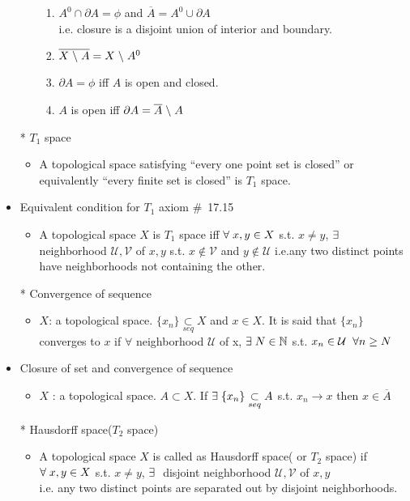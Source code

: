 \documentclass[12pt]{article}
\newcommand{\sptwo}{\hspace{0.2cm}}
\newcommand{\spone}{\hspace{0.1cm}}
\newcommand{\Nat}{\mathbb{N}}
\newcommand{\seq}{\underset{seq}{\subset}}
\newcommand{\cl}{\overline}
\newcommand{\diff}{\spone\backslash\spone}
\newcommand{\exist}{\exists\spone}
\begin{document}
\begin{itemize}
\begin{itemize}
\begin{enumerate}
			\item $A^0\cap \partial{A}=\phi$ and $\cl{A}=A^0\cup \partial{A}$ \\ i.e. \spone closure is a disjoint union of interior and boundary.
			\item $\cl{X\diff A}=X\diff A^0$
			\item $\partial{A}=\phi$ iff $A$ is open and closed.
			\item $A$ is open iff $\partial{A}=\cl{A}\diff A$ 
		\end{enumerate}
	\end{itemize}
	\item[*] $T_1$ space
	\begin{itemize}
		\item A topological space satisfying ``every one point set is closed'' or equivalently ``every finite set is closed'' is $T_1$ space.
	\end{itemize}
	\item Equivalent condition for $T_1$ axiom	\quad \#\ 17.15
	\begin{itemize}
		\item A topological space $X$ is $T_1$ space iff $\forall \spone x,y\in X$ s.t. $x\neq y$, $\exists \spone$ neighborhood $\mathcal{U}, \mathcal{V}$ of $x,y$ s.t. $x\notin \mathcal{V}$ and $y\notin \mathcal{U}$ \sptwo i.e.\sptwo  any two distinct points have neighborhoods not containing the other.
	\end{itemize}
	\item[*] Convergence of sequence
	\begin{itemize}
		\item $X$: a topological space. $\{x_n\}\seq X$ and $x\in X$. It is said that $\{x_n\}$ converges to $x$ if $\forall$ neighborhood $\mathcal{U}$ of x, $\exists \spone N\in \Nat$ s.t. $x_n\in \mathcal{U} \sptwo \forall n\geq N$
	\end{itemize}
	\item Closure of set and convergence of sequence
	\begin{itemize}
		\item $X$ : a topological space. $A\subset X$. If $\exist \{x_n\}\seq A$ s.t. $x_n\rightarrow x$ then $x\in \cl{A}$
	\end{itemize}
	\item[*] Hausdorff space\spone($T_2$ space)
	\begin{itemize}
		\item A topological space $X$ is called as Hausdorff space( or $T_2$ space) if \spone $\forall\spone x,y\in X$ s.t. $x\neq y$, $\exists \spone$ disjoint neighborhood $\mathcal{U}, \mathcal{V}$ of $x, y$ \\i.e. \spone any two distinct points are separated out by disjoint neighborhoods.

\end{itemize}
\end{itemize}
\end{document}
